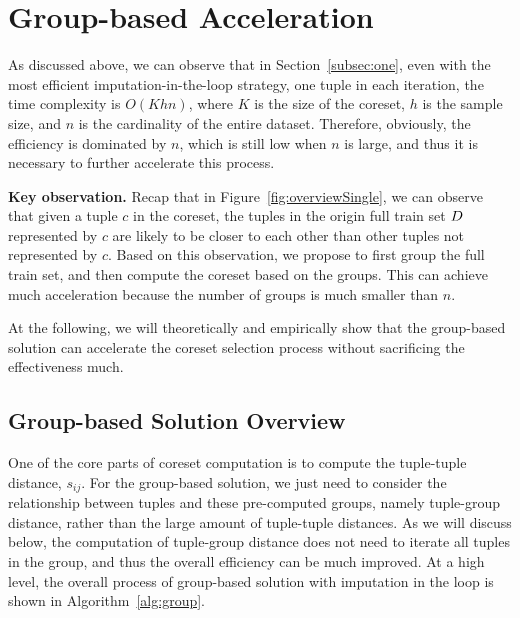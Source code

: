 

\section{Group-based Acceleration}
\label{sec:group}

As discussed above, we can observe that in Section~\ref{subsec:one}, even with the most efficient imputation-in-the-loop  strategy, \ie  one tuple in  each iteration, the time complexity is  $O(Khn)$, where $K$ is the size of the coreset, $h$ is the sample size,  and $n$ is the cardinality of the entire dataset. Therefore, obviously, the efficiency is dominated by $n$, which is still low when $n$ is large, and thus it  is necessary to further accelerate this process.

\noindent \textbf{Key observation.}   Recap that in Figure~\ref{fig:overviewSingle}, we can observe that  given a tuple $c$ in the coreset, the tuples in the origin full train set $D$ represented by $c$ are likely to be  closer to each other than other tuples not represented by $c$.
Based on this observation, we propose to first group the full train set, and then compute the coreset based on the groups. This can achieve much acceleration because the number of groups is much smaller than $n$. 

At the following, we will theoretically and empirically show that the group-based solution can accelerate the coreset selection process without sacrificing the effectiveness much.


\subsection{Group-based Solution Overview}


One of the core parts of coreset computation is to compute the tuple-tuple distance, \ie $s_{ij}$. For the group-based solution, we just need to consider the relationship between tuples and these pre-computed groups, namely tuple-group distance, rather than the large amount of tuple-tuple distances. As we will discuss below, the computation of tuple-group distance does not need to iterate all tuples in the group, and thus  the overall efficiency can be much improved. 
%
At a high level, the overall process of group-based \ours solution with imputation in the loop is shown in Algorithm~\ref{alg:group}.%

